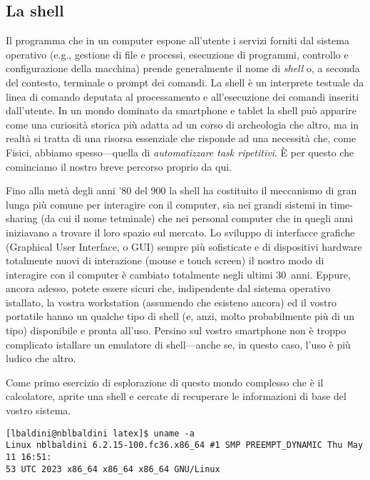 \subsection{La shell}

Il programma che in un computer espone all'utente i servizi forniti dal sistema operativo
(e.g., gestione di file e processi, esecuzione di programmi, controllo e configurazione
della macchina) prende generalmente il nome di \emph{shell} o, a seconda del contesto,
terminale o prompt dei comandi. La shell \`e un interprete testuale da linea di comando
deputata al processamento e all'esecuzione dei comandi inseriti dall'utente.
In un mondo dominato da smartphone e tablet la shell pu\`o apparire come una curiosit\`a
storica pi\`u adatta ad un corso di archeologia che altro, ma in realt\`a si tratta
di una risorsa essenziale che risponde ad una necessit\`a che, come Fisici, abbiamo
spesso---quella di \emph{automatizzare task ripetitivi}. \`E per questo che cominciamo
il nostro breve percorso proprio da qui.

Fino alla met\`a degli anni '80 del 900 la shell ha costituito il meccanismo di gran
lunga pi\`u comune per interagire con il computer, sia nei grandi sistemi in time-sharing
(da cui il nome tetminale) che nei personal computer che in quegli anni iniziavano a
trovare il loro spazio sul mercato. Lo sviluppo di interfacce grafiche (Graphical User
Interface, o GUI) sempre pi\`u  sofisticate e di dispositivi hardware totalmente nuovi di
interazione (mouse e touch screen) il nostro modo di interagire con il computer \`e
cambiato totalmente negli ultimi $30$~anni. Eppure, ancora adesso, potete essere sicuri
che, indipendente dal sistema operativo istallato, la vostra workstation (assumendo che
esisteno ancora) ed il vostro  portatile hanno un qualche tipo di shell (e, anzi, molto
probabilmente pi\`u di un tipo) disponibile e pronta all'uso. Persino sul vostro smartphone
non \`e troppo complicato istallare un emulatore di shell---anche se, in questo caso,
l'uso \`e pi\`u ludico che altro.

Come primo esercizio di esplorazione di questo mondo complesso che \`e il calcolatore,
aprite una shell e cercate di recuperare le informazioni di base del vostro sistema.

\begin{Verbatim}
[lbaldini@nblbaldini latex]$ uname -a
Linux nblbaldini 6.2.15-100.fc36.x86_64 #1 SMP PREEMPT_DYNAMIC Thu May 11 16:51:
53 UTC 2023 x86_64 x86_64 x86_64 GNU/Linux
\end{Verbatim}

